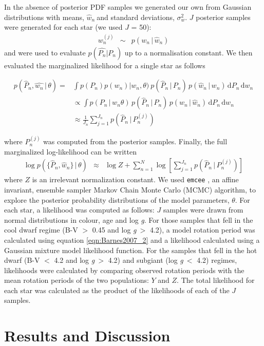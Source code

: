 \documentclass[10pt,preprint]{aastex}
\newcommand{\logg}{log \emph{g}}
\newcommand{\wh}{$\hat{w}_n$}
\newcommand{\dd}{\ensuremath{\,\mathrm{d}}}
\begin{document}
In the absence of posterior PDF samples we generated our own from Gaussian distributions with means, \wh$~$and standard deviations, $\sigma_w^2$.
$J$ posterior samples were generated for each star (we used $J$ = 50):
\begin{eqnarray}
w_n^{(j)} &\sim& p(w_n\,|\,\hat{w}_n)
\end{eqnarray}
and were used to evaluate $p(\hat{P_n}|P_n)$ up to a normalisation constant.
We then evaluated the marginalized likelihood for a single star as follows

\begin{align}
	p(\hat{P}_n,\hat{w_n}\,|\,\theta) = & \int p(P_n)p(w_n) |w_n, \theta)\ p(\hat{P}_n\,|\,P_n)\,p(\hat{w}_n\,|\,w_n) \dd P_n \dd w_n \nonumber\\
&\propto \int
    p(P_n\,|\,w_n\theta)\,p(\hat{P}_n\,|\,P_n)\,
    p(w_n\,|\,\hat{w}_n)
    \dd P_n \dd w_n \nonumber\\
&\approx \frac{1}{J_n} \sum_{j=1}^{J_n}p(\hat{P}_n\,|\,P_n^{(j)})
\end{align}

where $P_n^{(j)}$ was computed from the posterior samples.
Finally, the full marginalized log-likelihood can be written
\begin{eqnarray}
	\log p(\{\hat{P}_n,\hat{w}_n\}\,|\,\theta) &\approx&
    \log Z + \sum_{n=1}^N
        \log \left[ \sum_{j=1}^{J_n}p(\hat{P}_n\,|\,P_n^{(j)}) \right ]
\end{eqnarray}
where $Z$ is an irrelevant normalization constant.
We used {\tt emcee} \citep{Foreman-Mackey2013}, an affine invariant, ensemble sampler Markov Chain Monte Carlo (MCMC) algorithm, to explore the posterior probability distributions of the model parameters, $\theta$.
For each star, a likelihood was computed as follows: $J$ samples were drawn from normal distributions in colour, age and \logg.
For those samples that fell in the cool dwarf regime (B-V $>$ 0.45 and \logg$~>$ 4.2), a model rotation period was calculated using equation \ref{eqn:Barnes2007_2} and a likelihood calculated using a Gaussian mixture model likelihood function.
For the samples that fell in the hot dwarf (B-V $<$ 4.2 and \logg$~>$ 4.2) and subgiant (\logg$~<$ 4.2) regimes, likelihoods were calculated by comparing observed rotation periods with the mean rotation periods of the two populations: $Y$ and $Z$.
The total likelihood for each star was calculated as the product of the likelihoods of each of the $J$ samples.

\section{Results and Discussion}
\label{sec:results}
\end{document}
